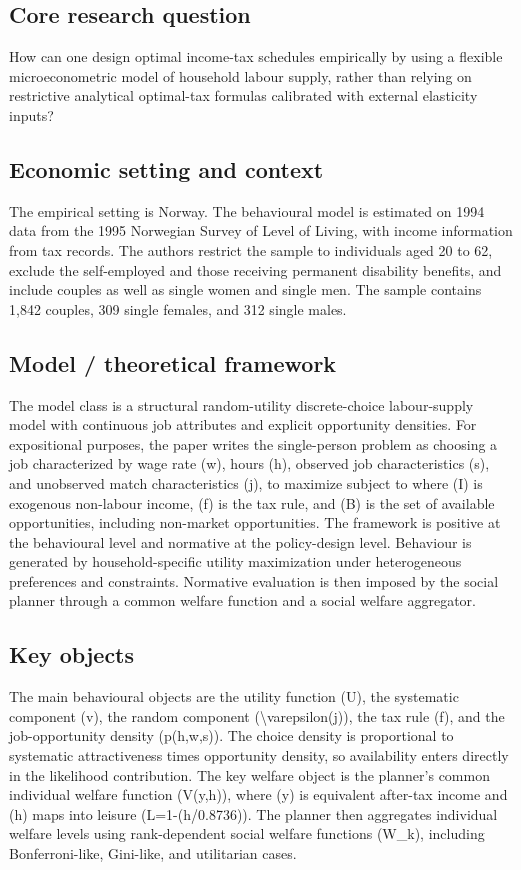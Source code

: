 \documentclass[11pt,a4paper]{article}
\begin{document}
\subsection*{Core research question}
How can one design optimal income-tax schedules empirically by using a flexible microeconometric model of household labour supply, rather than relying on restrictive analytical optimal-tax formulas calibrated with external elasticity inputs?

\subsection*{Economic setting and context}
The empirical setting is Norway. The behavioural model is estimated on 1994 data from the 1995 Norwegian Survey of Level of Living, with income information from tax records. The authors restrict the sample to individuals aged 20 to 62, exclude the self-employed and those receiving permanent disability benefits, and include couples as well as single women and single men. The sample contains 1,842 couples, 309 single females, and 312 single males.

\subsection*{Model / theoretical framework}
The model class is a structural random-utility discrete-choice labour-supply model with continuous job attributes and explicit opportunity densities. For expositional purposes, the paper writes the single-person problem as choosing a job characterized by wage rate (w), hours (h), observed job characteristics (s), and unobserved match characteristics (j), to maximize subject to where (I) is exogenous non-labour income, (f) is the tax rule, and (B) is the set of available opportunities, including non-market opportunities. The framework is positive at the behavioural level and normative at the policy-design level. Behaviour is generated by household-specific utility maximization under heterogeneous preferences and constraints. Normative evaluation is then imposed by the social planner through a common welfare function and a social welfare aggregator.

\subsection*{Key objects}
The main behavioural objects are the utility function (U), the systematic component (v), the random component (\textbackslash{}varepsilon(j)), the tax rule (f), and the job-opportunity density (p(h,w,s)). The choice density is proportional to systematic attractiveness times opportunity density, so availability enters directly in the likelihood contribution. The key welfare object is the planner’s common individual welfare function (V(y,h)), where (y) is equivalent after-tax income and (h) maps into leisure (L=1-(h/0.8736)). The planner then aggregates individual welfare levels using rank-dependent social welfare functions (W\_k), including Bonferroni-like, Gini-like, and utilitarian cases.
\end{document}
